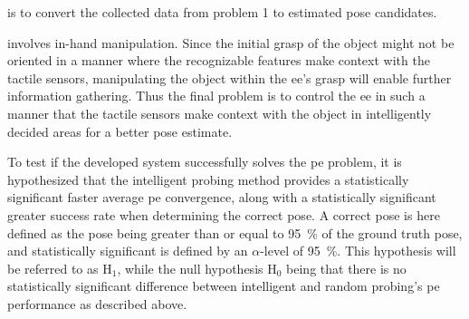 \begin{problem} \label{prob:2}
	\normalfont is to convert the collected data from problem 1 to estimated pose candidates.
\end{problem}

\begin{problem} \label{prob:3}
	\normalfont involves in-hand manipulation. Since the initial grasp of the object might not be oriented in a manner where the recognizable features make context with the tactile sensors, manipulating the object within the \gls{ee}'s grasp will enable further information gathering. Thus the final problem is to control the \gls{ee} in such a manner that the tactile sensors make context with the object in intelligently decided areas for a better pose estimate.
\end{problem}

To test if the developed system successfully solves the \gls{pe} problem, it is hypothesized that the intelligent probing method provides a statistically significant faster average \gls{pe} convergence, along with a statistically significant greater success rate when determining the correct pose. A correct pose is here defined as the pose being greater than or equal to \SI{95}{\percent} of the ground truth pose, and statistically significant is defined by an $\alpha$-level of \SI{95}{\percent}. This hypothesis will be referred to as $\text{H}_1$, while the null hypothesis $\text{H}_0$ being that there is no statistically significant difference between intelligent and random probing's \gls{pe} performance as described above.




